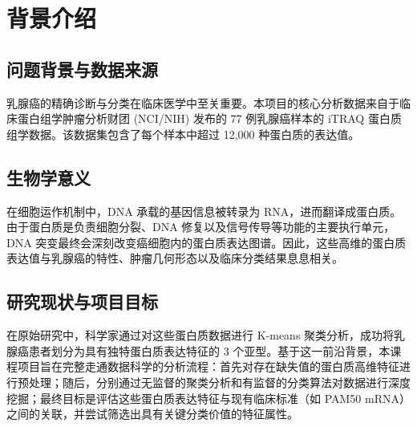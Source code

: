 \section{背景介绍}

\label{sec:introduction}

\subsection{问题背景与数据来源}

乳腺癌的精确诊断与分类在临床医学中至关重要。本项目的核心分析数据来自于临床蛋白组学肿瘤分析财团 (NCI/NIH) 发布的 77 例乳腺癌样本的 iTRAQ 蛋白质组学数据。该数据集包含了每个样本中超过 12,000 种蛋白质的表达值。

\subsection{生物学意义}

在细胞运作机制中，DNA 承载的基因信息被转录为 RNA，进而翻译成蛋白质。由于蛋白质是负责细胞分裂、DNA 修复以及信号传导等功能的主要执行单元，DNA 突变最终会深刻改变癌细胞内的蛋白质表达图谱。因此，这些高维的蛋白质表达值与乳腺癌的特性、肿瘤几何形态以及临床分类结果息息相关。

\subsection{研究现状与项目目标}

在原始研究中，科学家通过对这些蛋白质数据进行 K-means 聚类分析，成功将乳腺癌患者划分为具有独特蛋白质表达特征的 3 个亚型。基于这一前沿背景，本课程项目旨在完整走通数据科学的分析流程：首先对存在缺失值的蛋白质高维特征进行预处理；随后，分别通过无监督的聚类分析和有监督的分类算法对数据进行深度挖掘；最终目标是评估这些蛋白质表达特征与现有临床标准（如 PAM50 mRNA）之间的关联，并尝试筛选出具有关键分类价值的特征属性。
